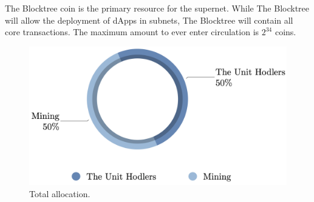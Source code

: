 \documentclass[12pt]{article}
\begin{document}
The Blocktree coin is the primary resource for the supernet. While The Blocktree will allow the deployment of dApps in subnets, The Blocktree will contain all core transactions. The maximum amount to ever enter circulation is $2^{34}$ coins.

\begin{figure}[h!]
\centering
  \includegraphics[width=5in]{images/The_Blocktree_Allocation.png}
  \caption{Total allocation.}
  \label{fig:allocation}
\end{figure}
\end{document}
